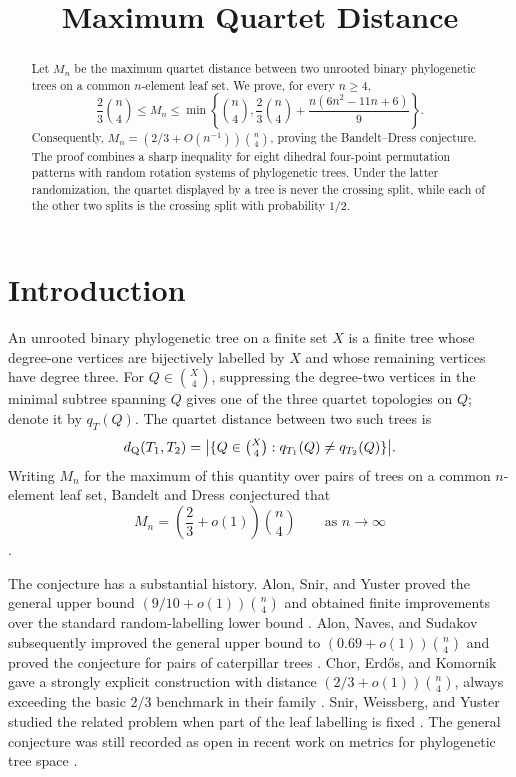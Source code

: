 \documentclass[a4paper]{amsart}
\title{Maximum Quartet Distance}
\date{}
\theoremstyle{remark}
\newcommand{\qd}{d_{\mathrm Q}}
\begin{document}
\begin{abstract}
Let $M_n$ be the maximum quartet distance between two unrooted binary
phylogenetic trees on a common $n$-element leaf set. We prove, for every
$n\ge4$,
\[
 \frac23\binom n4
 \le M_n
 \le \min\left\{\binom n4,
 \frac23\binom n4+\frac{n(6n^2-11n+6)}9\right\}.
\]
Consequently,
$M_n=(2/3+O(n^{-1}))\binom n4$, proving the Bandelt--Dress
conjecture. The proof combines a sharp inequality for eight dihedral
four-point permutation patterns with random rotation systems of
phylogenetic trees. Under the latter randomization, the quartet displayed
by a tree is never the crossing split, while each of the other two splits
is the crossing split with probability $1/2$.
\end{abstract}

\maketitle

\section{Introduction}

An unrooted binary phylogenetic tree on a finite set $X$ is a finite
tree whose degree-one vertices are bijectively labelled by $X$ and
whose remaining vertices have degree three. For $Q\in\binom X4$,
suppressing the degree-two vertices in the minimal subtree spanning
$Q$ gives one of the three quartet topologies on $Q$; denote it by
$q_T(Q)$. The quartet distance between two such trees is
\[
 \qd(T_1,T_2)
 =
 \bigl|\{Q\in\tbinom X4:q_{T_1}(Q)\ne q_{T_2}(Q)\}\bigr|.
\]
Writing $M_n$ for the maximum of this quantity over pairs of trees on
a common $n$-element leaf set, Bandelt and Dress conjectured that
\[
 M_n=\left(\frac23+o(1)\right)\binom n4
 \qquad\text{as }n\to\infty
\]
\cite{BandeltDress}.

The conjecture has a substantial history. Alon, Snir, and Yuster
proved the general upper bound
$(9/10+o(1))\binom n4$ and obtained finite improvements over the
standard random-labelling lower bound \cite{AlonSnirYuster}.
Alon, Naves, and Sudakov subsequently improved the general upper bound
to $(0.69+o(1))\binom n4$ and proved the conjecture for pairs of
caterpillar trees \cite{AlonNavesSudakov}. Chor, Erd\H{o}s, and
Komornik gave a strongly explicit construction with distance
$(2/3+o(1))\binom n4$, always exceeding the basic $2/3$ benchmark in
their family \cite{ChorErdosKomornik}. Snir, Weissberg, and Yuster
studied the related problem when part of the leaf labelling is fixed
\cite{SnirWeissbergYuster}. The general conjecture was still recorded
as open in recent work on metrics for phylogenetic tree space
\cite{CzabarkaEtAl}.
\end{document}

